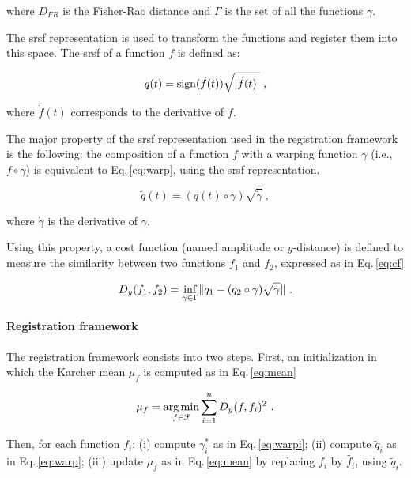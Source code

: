 \noindent where $D_{FR}$ is the Fisher-Rao distance and $\Gamma$ is the set of all the functions $\gamma$.

The \Ac{srsf} representation is used to transform the functions and register them into this space. The \ac{srsf} of a function $f$ is defined as:

\begin{equation}
  q(t) = \operatorname*{sign}(\dot{f}(t))\sqrt{|\dot{f}(t)|} \ ,
  \label{eq:srsf}
\end{equation}

\noindent where $\dot{f}(t)$ corresponds to the derivative of $f$.

The major property of the \ac{srsf} representation used in the registration framework is the following: the composition of a function $f$ with a warping function $\gamma$ (i.e., $f \circ \gamma$) is equivalent to Eq.\,\eqref{eq:warp}, using the \ac{srsf} representation.

\begin{equation}
  \tilde{q}(t) = (q(t) \circ \gamma) \sqrt{\dot{\gamma}} \ ,
  \label{eq:warp}
\end{equation}

\noindent where $\dot{\gamma}$ is the derivative of $\gamma$.

Using this property, a cost function (named amplitude or $y$-distance) is defined to measure the similarity between two functions $f_1$ and $f_2$, expressed as in Eq.\,\eqref{eq:cf}

\begin{equation}
  D_y(f_1, f_2) = \underset{\gamma \in \Gamma}{\operatorname*{inf}} \| q_1 - (q_2 \circ \gamma) \sqrt{\dot{\gamma}} \| \ .
  \label{eq:cf}
\end{equation}

\paragraph{Registration framework}\label{par:chp5:T2-norm:regfra}

The registration framework consists into two steps. First, an initialization in which the Karcher mean $\mu_f$ is computed as in Eq.\,\eqref{eq:mean}

\begin{equation}
  \mu_f = \operatorname*{arg\,min}_{f \in \mathcal{F}} \sum_{i = 1}^{n} D_y(f, f_i)^2 \ .
  \label{eq:mean}
\end{equation}

Then, for each function $f_i$: 
(i) compute $\gamma_{i}^{*}$ as in Eq.\,\eqref{eq:warpi}; 
(ii) compute $\tilde{q}_i$ as in Eq.\,\eqref{eq:warp};
(iii) update $\mu_f$ as in Eq.\,\eqref{eq:mean} by replacing $f_i$ by $\tilde{f_i}$, using $\tilde{q}_i$.

